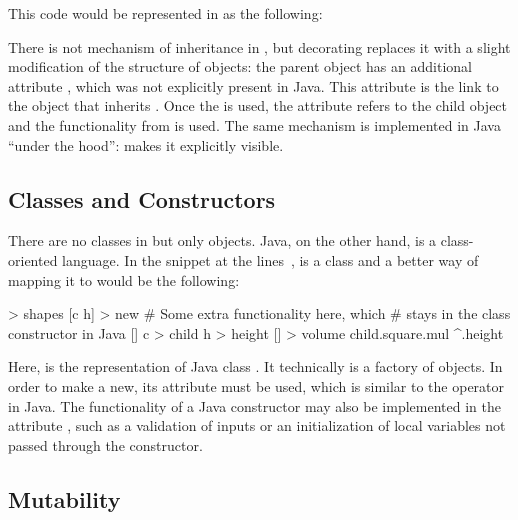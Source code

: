 This code would be represented in \eo{} as the following:


There is not mechanism of inheritance in \eo{}, but decorating replaces
it with a slight modification of the structure of objects: the parent
object  has an additional attribute , which was
not explicitly present in Java. This attribute is the link to the object
that inherits . Once the  is used, the attribute
refers to the child object and the functionality from  is used.
The same mechanism is implemented in Java ``under the hood'': \eo{}
makes it explicitly visible.

\subsection{Classes and Constructors}

There are no classes in \eo{} but only objects. Java, on the other hand,
is a class-oriented language. In the snippet
at the lines~,  is a class
and a better way of mapping it to \eo{} would be the following:

\begin{ffcode}
[] > shapes
  [c h] > new
    # Some extra functionality here, which
    # stays in the class constructor in Java
    []
      c > child
      h > height
      [] > volume
        child.square.mul ^.height
\end{ffcode}

Here,  is the representation of Java class . It technically
is a factory of objects. In order to make a new, its attribute 
must be used, which is similar to the operator  in Java.
The functionality of a Java constructor may also be implemented
in the attribute , such as a validation of inputs or
an initialization of local variables not passed through the constructor.

\subsection{Mutability}


